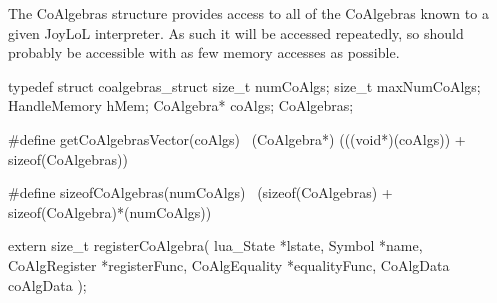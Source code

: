 \startTestSuite[registerCoAlgebra]

The CoAlgebras structure provides access to all of the CoAlgebras known to 
a given JoyLoL interpreter. As such it will be accessed repeatedly, so 
should probably be accessible with as few memory accesses as possible. 

\startCHeader
typedef struct coalgebras_struct {
  size_t       numCoAlgs;
  size_t       maxNumCoAlgs;
  HandleMemory hMem;
  CoAlgebra*   coAlgs;
} CoAlgebras;

#define getCoAlgebrasVector(coAlgs) \
  (CoAlgebra*) (((void*)(coAlgs)) + sizeof(CoAlgebras))

#define sizeofCoAlgebras(numCoAlgs) \
  (sizeof(CoAlgebras) + sizeof(CoAlgebra)*(numCoAlgs))
  
extern size_t registerCoAlgebra(
  lua_State     *lstate,
  Symbol        *name,
  CoAlgRegister *registerFunc,
  CoAlgEquality *equalityFunc,
  CoAlgData      coAlgData
);
\stopCHeader

